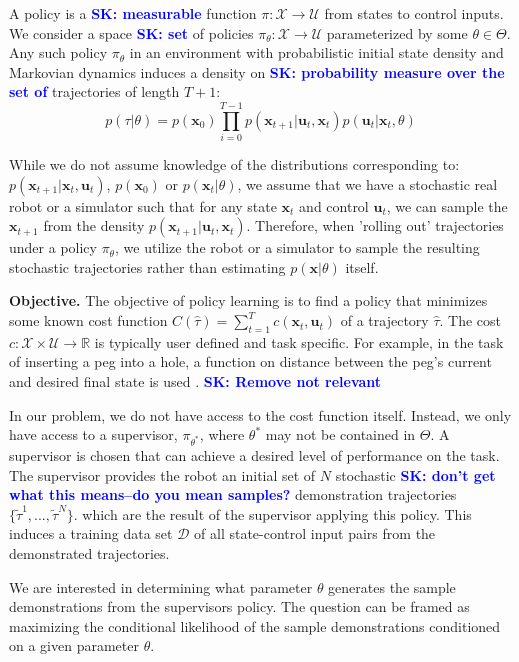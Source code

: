 \documentclass[10pt, conference]{ieeeconf}      %
\newcommand{\bu}{\mathbf{u}}
\newcommand{\bx}{\mathbf{x}}
\newcommand{\sknote}[1]{%
 {\textcolor{blue}{\textbf{SK: #1}}}{}}
\begin{document}
A policy is a \sknote{measurable} function $\pi: \mathcal{X} \to \mathcal{U}$ from states to control inputs. 
We consider a space \sknote{set} of policies $\pi_{\theta}:\mathcal{X}\to \mathcal{U}$ parameterized by some $\theta\in \Theta$. Any such policy $\pi_{\theta}$ in an environment with probabilistic initial state density and Markovian dynamics
induces a density on \sknote{probability measure over the set of}  trajectories of length $T+1$: $$p(\tau | \theta)=
p(\bx_0)\prod_{i=0}^{T-1}p(\bx_{t+1}|\bu_t,\bx_t)p(\bu_t|\bx_t,\theta)$$


While we do not assume knowledge of the distributions corresponding to: $p(\bx_{t+1}|\bx_t,\bu_t)$, $p(\bx_0)$ or $p(\bx_t|
\theta)$, we assume that we have a stochastic real robot or a simulator such that for any state
$\bx_t$ and control $\bu_t$, we can sample the $\bx_{t+1}$ from the density $p(\bx_{t+1}|\bu_t,\bx_t)$. 
Therefore, when 'rolling out' trajectories under a policy
$\pi_{\theta}$, we utilize the robot or a simulator to sample the resulting stochastic trajectories rather than
estimating $p(\bx|\theta)$ itself.


\noindent\textbf{Objective.} The objective of  policy learning is to find a policy that minimizes some known cost function $C(\hat{\tau}) = \sum^T_{t=1} c(\bx_t,\bu_t)$ of a trajectory $\hat{\tau}$. The cost $c:\mathcal{X}\times \mathcal{U}\to \mathbb{R}$ is typically user defined and task specific. 
For example, in the task of inserting a peg into a hole, a function on distance between the peg's current and desired final state is used \cite{levine2015end}.  
\sknote{Remove not relevant}

In our problem, we do not have access to the cost function itself. Instead, we only have access to 
a supervisor, $\pi_{\theta^*}$, where $\theta^*$ may not be contained in $\Theta$. A supervisor is chosen that can achieve a desired level of performance on the task. The supervisor provides the robot an initial set
of $N$ stochastic \sknote{don't get what this means--do you mean samples?} demonstration trajectories $\lbrace \tilde{\tau}^1,...,\tilde{\tau}^N \rbrace$. 
which are the result of the supervisor applying this policy. This induces a training data set $\mathcal{D}$ of all state-control input pairs from the demonstrated trajectories.

We are interested in determining what parameter $\theta$ generates the sample demonstrations from the supervisors policy. The question can be framed as maximizing the conditional likelihood of the sample demonstrations conditioned on a given parameter $\theta$. 
\end{document}
